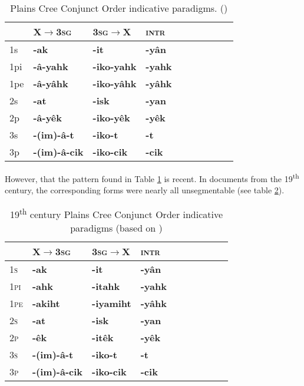 \documentclass{article}
\newcommand{\ipa}[1]{{\phon\textbf{#1}}}
\newcommand{\bleu}[1]{\cellcolor{blue!30}\textbf{#1}}
\begin{document}
\begin{table}[H]
\caption{Plains Cree Conjunct Order indicative paradigms.  (\citealt{wolfart96sketch})}
\label{tab:cree.conj} \centering
\begin{tabular}{llllllllll}
  \bottomrule
  &	X$\rightarrow$\textsc{3sg} &	\textsc{3sg}$\rightarrow$X &	\textsc{intr} &	\\	
  \midrule
  1s &	\ipa{-ak} \bleu{} &	\ipa{-it} \bleu{}&	\ipa{-yân} &	\\
1pi &	\ipa{-â-yahk} &	\ipa{-iko-yahk} &	\ipa{-yahk} &	\\
1pe &	\ipa{-â-yâhk} &	\ipa{-iko-yâhk} &	\ipa{-yâhk} &	\\
2s &	\ipa{-at} \bleu{}&	\ipa{-isk} \bleu{}&	\ipa{-yan} &	\\
2p &	\ipa{-â-yêk} &	\ipa{-iko-yêk} &	\ipa{-yêk} &	\\
3s &	\ipa{-(im)-â-t} &	\ipa{-iko-t} &	\ipa{-t} &	\\
3p &	\ipa{-(im)-â-cik} &	\ipa{-iko-cik} &	\ipa{-cik} &	\\
    \bottomrule
\end{tabular}
\end{table}

However, that  the pattern found in Table   \ref{tab:cree.conj} is recent. In documents from the 19\textsuperscript{th} century, the corresponding forms were nearly all unsegmentable (see table \ref{tab:creedia.conj}).

\begin{table}[H]
\caption{19\textsuperscript{th} century Plains Cree Conjunct Order indicative paradigms (based on \citealt{dahlstrom89change})}
\label{tab:creedia.conj} \centering
\begin{tabular}{llllllllll}
  \bottomrule
  &	X$\rightarrow$\textsc{3sg} &	\textsc{3sg}$\rightarrow$X &	\textsc{intr} &	\\	
  \midrule
\textsc{1s} &	\ipa{-ak} &	\ipa{-it} &	\ipa{-yân} &	\\
\textsc{1pi} &	\ipa{-ahk} &	\ipa{-itahk} &	\ipa{-yahk} &	\\
\textsc{1pe} &	\ipa{-akiht} &	\ipa{-iyamiht} &	\ipa{-yâhk} &	\\
\textsc{2s} &	\ipa{-at} &	\ipa{-isk} &	\ipa{-yan} &	\\
\textsc{2p} &	\ipa{-êk} &	\ipa{-itêk} &	\ipa{-yêk} &	\\
\textsc{3s} &	\ipa{-(im)-â-t} &	\ipa{-iko-t} &	\ipa{-t} &	\\
\textsc{3p} &	\ipa{-(im)-â-cik} &	\ipa{-iko-cik} &	\ipa{-cik} &	\\
  \bottomrule
\end{tabular}
\end{table}
\end{document}
